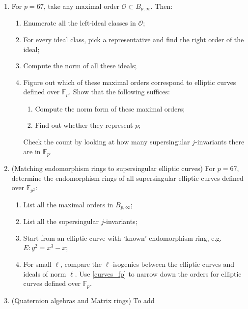 \documentclass[12pt]{report}
\newcommand{\F}{\mathbb{F}}
\renewcommand{\O}{\mathcal{O}}
\begin{document}
\begin{enumerate}
\item For $p= 67$, take any maximal order $\O \subset B_{p, \infty}$. Then:
\begin{enumerate}
\item Enumerate all the left-ideal classes in $\O$;
\item For every ideal class, pick a representative and find the right order of the ideal;
\item Compute the norm of all these ideals;
\item Figure out which of these maximal orders correspond to elliptic curves defined over $\mathbb{F}_p$. Show that the following suffices: \label{curves_fp}
\begin{enumerate}
\item Compute the norm form of these maximal orders;
\item Find out whether they represent $p$;
\end{enumerate}
Check the count by looking at how many supersingular $j$-invariants there are in $\mathbb{F}_p$.


 
\end{enumerate}

\item (Matching endomorphism rings to supersingular elliptic curves) For $p = 67$, determine the endomorphism rings of all supersingular elliptic curves defined over $\mathbb{F}_{p^2}$:
\begin{enumerate}
\item List all the maximal orders in $B_{p, \infty}$;
\item List all the supersingular $j$-invariants;
\item  Start from an elliptic curve with `known' endomorphism ring, e.g. $E : y^2 = x^3 - x$;
\item For small $\ell$, compare the $\ell$-isogenies between the elliptic curves and ideals of norm $\ell$. 
Use \eqref{curves_fp} to narrow down the orders for elliptic curves defined over $\F_p$.
\end{enumerate}


\item (Quaternion algebras and Matrix rings) To add

\end{enumerate}
\end{document}
